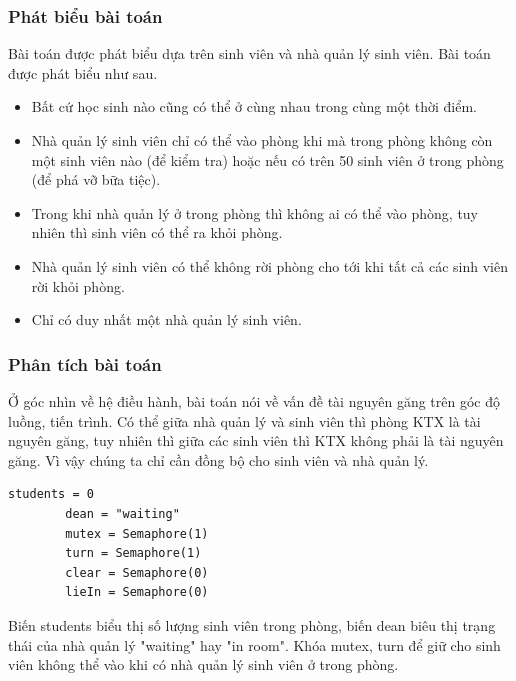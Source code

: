\documentclass[12pt]{article}
\begin{document}
    	\subsubsection{Phát biểu bài toán}
    	Bài toán được phát biểu dựa trên sinh viên và nhà quản lý sinh viên. Bài toán được phát biểu như sau.
    	\begin{itemize}
    	\item Bất cứ học sinh nào cũng có thể ở cùng nhau trong cùng một thời điểm.
    	\item Nhà quản lý sinh viên chỉ có thể vào phòng khi mà trong phòng không còn một sinh viên nào (để kiểm tra) hoặc nếu có trên 50 sinh viên ở trong phòng (để phá vỡ bữa tiệc).
    	\item Trong khi nhà quản lý ở trong phòng thì không ai có thể vào phòng, tuy nhiên thì sinh viên có thể ra khỏi phòng.
    	\item Nhà quản lý sinh viên có thể không rời phòng cho tới khi tất cả các sinh viên rời khỏi phòng.
    	\item Chỉ có duy nhất một nhà quản lý sinh viên.
    	\end{itemize}
    	\subsubsection{Phân tích bài toán}
    	Ở góc nhìn về hệ điều hành, bài toán nói về vấn đề tài nguyên găng trên góc độ luồng, tiến trình. Có thể giữa nhà quản lý và sinh viên thì phòng KTX là tài nguyên găng, tuy nhiên thì giữa các sinh viên thì KTX không phải là tài nguyên găng. Vì vậy chúng ta chỉ cần đồng bộ cho sinh viên và nhà quản lý.
     	\begin{lstlisting}[style = Python]
    		students = 0
		dean = "waiting"
		mutex = Semaphore(1)
		turn = Semaphore(1)
		clear = Semaphore(0)
		lieIn = Semaphore(0)
    	\end{lstlisting}
    	Biến students biểu thị số lượng sinh viên trong phòng, biến dean biêu thị trạng thái của nhà quản lý "waiting" hay "in room". Khóa mutex, turn để giữ cho sinh viên không thể vào khi có nhà quản lý sinh viên ở trong phòng.
\end{document}
